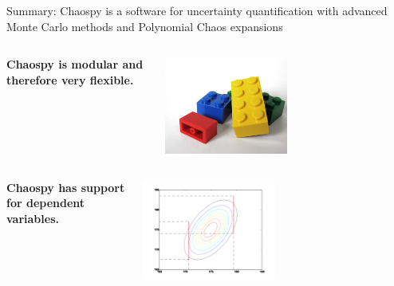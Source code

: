 \documentclass[presentation]{beamer}
\begin{document}
\begin{frame}{Summary: Chaospy is a software for uncertainty quantification with advanced Monte Carlo methods and Polynomial Chaos expansions}

\vspace{-5mm}
\begin{columns}

     \begin{center}
      \bf{Chaospy is modular and therefore very flexible.}
     \end{center}
     \begin{center}
            \includegraphics[width=0.5\textwidth]{lego.jpg}
     \end{center}

 \end{columns}

\begin{columns}
  \begin{center}
   \bf{Chaospy has support for dependent variables.}
  \end{center}
     \begin{center}
            \includegraphics[width=0.5\textwidth]{dependent.png}
     \end{center}

 \end{columns}




\end{frame}
\end{document}
